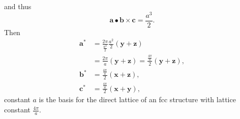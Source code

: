 \documentclass{article}
\begin{document}
and thus
$$
\mathbf{a} \bullet \mathbf{b} \times \mathbf{c} = \frac{a^3}{2}.
$$
Then
\begin{align*}
  \mathbf{a^\ast} &= \frac{2\pi}{\frac{a^3}{2}} \frac{a^2}{2} (\mathbf{y} + \mathbf{z}) \\
  &= \frac{2\pi}{a} (\mathbf{y} + \mathbf{z}) 
   = \frac{\frac{4\pi}{a}}{2} (\mathbf{y} + \mathbf{z}), \\
  \mathbf{b^\ast} &= \frac{\frac{4\pi}{a}}{2} (\mathbf{x} + \mathbf{z}), \\
  \mathbf{c^\ast} &= \frac{\frac{4\pi}{a}}{2} (\mathbf{x} + \mathbf{y}),
\end{align*}
constant $a$ is the basis for the direct lattice of an fcc structure with
lattice constant $\frac{4\pi}{a}$.
\end{document}
